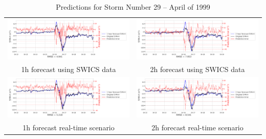 \documentclass[draft,sw]{agutexSI2019}
\begin{document}
\begin{table}
\centering
\begin{tabular}{cc}
\includegraphics[width=0.49\linewidth]{paper_plots_shade/1h_swics/1h_swics_storm_29.png}
&
\includegraphics[width=0.49\linewidth]{paper_plots_shade/2h_swics/2h_swics_storm_29.png}
\\
1h forecast using SWICS data & 2h forecast using SWICS data
\vspace*{12pt}
\\
\includegraphics[width=0.49\linewidth]{paper_plots_shade/1h_rt/1h_rt_storm_29.png}
&
\includegraphics[width=0.49\linewidth]{paper_plots_shade/2h_rt/2h_rt_storm_29.png}
\\
1h forecast real-time scenario & 2h forecast real-time scenario 
\vspace*{12pt}
\\
\end{tabular}
\caption{Predictions for Storm Number 29 -- April of 1999}
\label{storm-29}
\end{table}
\end{document}
